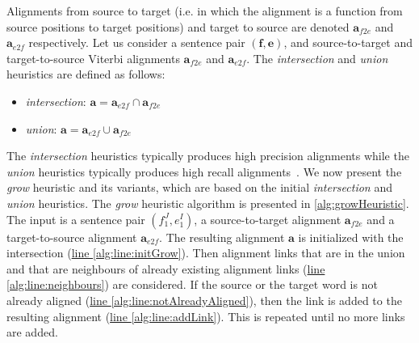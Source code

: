 Alignments from source to target (i.e. in which the alignment is
a function from source positions to target positions)
and target to source are denoted
$\bm{a}_{f2e}$ and $\bm{a}_{e2f}$ respectively.
Let us consider a sentence pair $(\bm{f}, \bm{e})$, and
source-to-target and target-to-source Viterbi alignments
$\bm{a}_{f2e}$ and $\bm{a}_{e2f}$.
The \emph{intersection} and \emph{union} heuristics
are defined as follows:
%
\begin{itemize}
  \item \emph{intersection}: $\bm{a} = \bm{a}_{e2f} \cap \bm{a}_{f2e}$
  \item \emph{union}: $\bm{a} = \bm{a}_{e2f} \cup \bm{a}_{f2e}$
\end{itemize}
%
The \emph{intersection} heuristics typically produces high precision alignments
while the \emph{union} heuristics typically produces high recall
alignments~\citep{och-ney:2003:CL}.
We now present the \emph{grow} heuristic and its variants, which are based
on the initial \emph{intersection} and \emph{union} heuristics.
The \emph{grow} heuristic algorithm is presented in
\autoref{alg:growHeuristic}. The input is a sentence
pair $(f_1^J, e_1^I)$, a source-to-target
alignment $\bm{a}_{f2e}$ and a target-to-source alignment
$\bm{a}_{e2f}$. The resulting alignment $\bm{a}$ is initialized
with the
intersection (\hyperlink{alg:line:initGrow}{line \ref{alg:line:initGrow}}).
Then alignment links that are in the union and that are neighbours of already existing
alignment links (\hyperlink{alg:line:neighbours}{line \ref{alg:line:neighbours}})
are considered. If the source or the target word is not already
aligned (\hyperlink{alg:line:notAlreadyAligned}{line \ref{alg:line:notAlreadyAligned}}),
then the link is added to the resulting
alignment (\hyperlink{alg:line:addLink}{line \ref{alg:line:addLink}}).
This is repeated until no more links are added.
%
